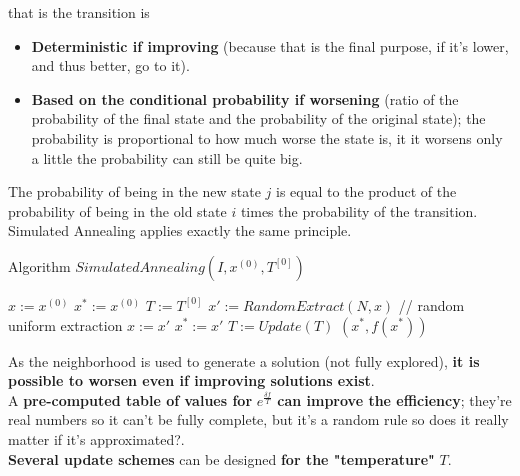 \documentclass[11pt]{article}
\begin{document}
	that is the transition is
	\begin{itemize}
		\item \textbf{Deterministic if improving} (because that is the final purpose, if it's lower, and thus better, go to it).\\
		
		\item \textbf{Based on the conditional probability if worsening} (ratio of the probability of the final state and the probability of the original state); the probability is proportional to how much worse the state is, it it worsens only a little the probability can still be quite big.\\
	\end{itemize}
	
	The probability of being in the new state $j$ is equal to the product of the probability of being in the old state $i$ times the probability of the transition.\\
	
	Simulated Annealing applies exactly the same principle.\\
	
	\newpage
	
	\begin{algorithm}
		\caption{Algorithm $SimulatedAnnealing(I , x^{(0)}, T^{[0]})$}
		\begin{algorithmic}
			\STATE $x := x^{(0)}$ 
			\STATE $x^\ast := x^{(0)}$ 
			\STATE $T := T^{[0]}$
				\STATE $x' := RandomExtract(N, x)$ // random uniform extraction
					\STATE $x := x'$
				\ENDIF
					\STATE $x^\ast := x'$
				\ENDIF
				$T := Update(T )$
			\ENDWHILE
			\RETURN $(x^\ast, f (x^\ast))$
		\end{algorithmic}
	\end{algorithm}
	
	As the neighborhood is used to generate a solution (not fully explored), \textbf{it is possible to worsen even if improving solutions exist}.\\
	
	A \textbf{pre-computed table of values for} $e^{\frac{\delta f}{T}}$ \textbf{can improve the efficiency}; they're real numbers so it can't be fully complete, but it's a random rule so does it really matter if it's approximated?.\\
	
	\textbf{Several update schemes} can be designed \textbf{for the "temperature"} $T$.\\
	
\end{document}
